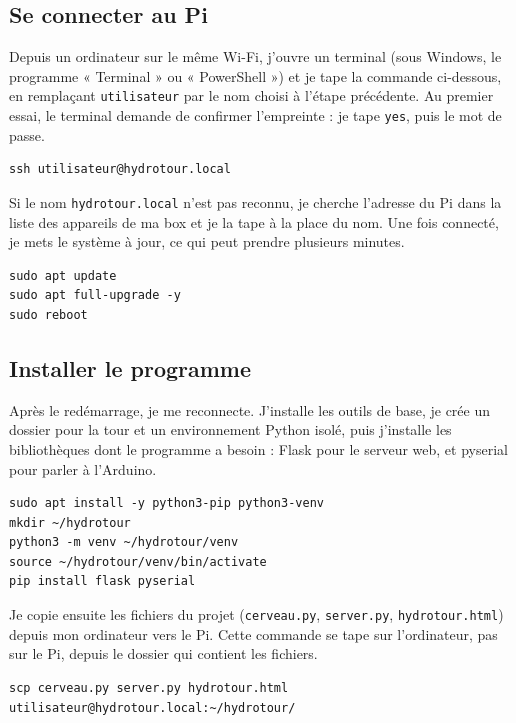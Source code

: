 \subsection{Se connecter au Pi}

Depuis un ordinateur sur le même Wi-Fi, j'ouvre un terminal (sous Windows, le programme « Terminal » ou « PowerShell ») et je tape la commande ci-dessous, en remplaçant \texttt{utilisateur} par le nom choisi à l'étape précédente. Au premier essai, le terminal demande de confirmer l'empreinte : je tape \texttt{yes}, puis le mot de passe.

\begin{verbatim}
ssh utilisateur@hydrotour.local
\end{verbatim}

Si le nom \texttt{hydrotour.local} n'est pas reconnu, je cherche l'adresse du Pi dans la liste des appareils de ma box et je la tape à la place du nom. Une fois connecté, je mets le système à jour, ce qui peut prendre plusieurs minutes.

\begin{verbatim}
sudo apt update
sudo apt full-upgrade -y
sudo reboot
\end{verbatim}

\subsection{Installer le programme}

Après le redémarrage, je me reconnecte. J'installe les outils de base, je crée un dossier pour la tour et un environnement Python isolé, puis j'installe les bibliothèques dont le programme a besoin : Flask pour le serveur web, et pyserial pour parler à l'Arduino.

\begin{verbatim}
sudo apt install -y python3-pip python3-venv
mkdir ~/hydrotour
python3 -m venv ~/hydrotour/venv
source ~/hydrotour/venv/bin/activate
pip install flask pyserial
\end{verbatim}

Je copie ensuite les fichiers du projet (\texttt{cerveau.py}, \texttt{server.py}, \texttt{hydrotour.html}) depuis mon ordinateur vers le Pi. Cette commande se tape sur l'ordinateur, pas sur le Pi, depuis le dossier qui contient les fichiers.

\begin{verbatim}
scp cerveau.py server.py hydrotour.html utilisateur@hydrotour.local:~/hydrotour/
\end{verbatim}


